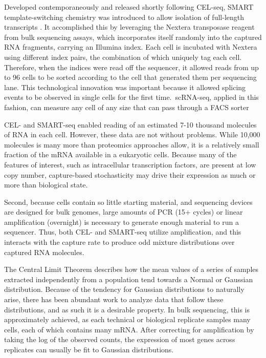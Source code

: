 Developed contemporaneously and released shortly following CEL-seq, SMART template-switching chemistry was introduced to allow isolation of full-length transcripts \citep{Ramskoeld2012}.
It accomplished this by leveraging the Nextera transposase reagent from bulk sequencing assays, which incorporates itself randomly into the captured RNA fragments, carrying an Illumina index. 
Each cell is incubated with Nextera using different index pairs, the combination of which uniquely tag each cell. 
Therefore, when the indices were read off the sequencer, it allowed reads from up to 96 cells to be sorted according to the cell that generated them per sequencing lane.
This technological innovation was important because it allowed splicing events to be observed in single cells for the first time.\
scRNA-seq, applied in this fashion, can measure any cell of any size that can pass through a FACS sorter

CEL- and SMART-seq enabled reading of an estimated 7-10 thousand molecules of RNA in each cell. 
However, these data are not without problems. 
While 10,000 molecules is many more than proteomics approaches allow, it is a relatively small fraction of the mRNA available in a eukaryotic cells. 
Because many of the features of interest, such as intracellular transcription factors, are present at low copy number, capture-based stochasticity may drive their expression as much or more than biological state. 

Second, because cells contain so little starting material, and sequencing devices are designed for bulk genomes, large amounts of PCR (15+ cycles) or linear amplification (overnight) is necessary to generate enough material to run a sequencer. 
Thus, both CEL- and SMART-seq utilize amplification, and this interacts with the capture rate to produce odd mixture distributions over captured RNA molecules. 

The Central Limit Theorem describes how the mean values of a series of samples extracted independently from a population tend towards a Normal or Gaussian distribution.
Because of the tendency for Gaussian distributions to naturally arise, there has been abundant work to analyze data that follow these distributions, and as such it is a desirable property. 
In bulk sequencing, this is approximately achieved, as each technical or biological replicate samples many cells, each of which contains many mRNA\@. 
After correcting for amplification by taking the log of the observed counts, the expression of most genes across replicates can usually be fit to Gaussian distributions. 

